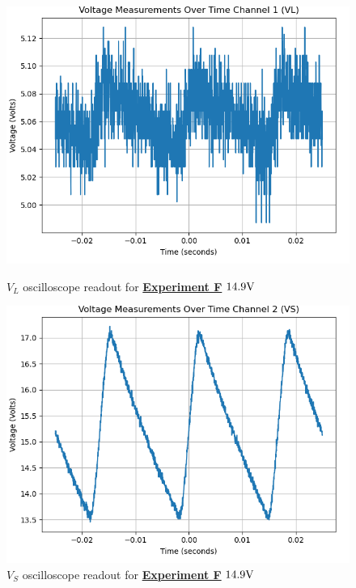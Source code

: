 \documentclass[
	letterpaper
	12pt
]{template}
\newcommand{\bref}[2]{\textbf{\hyperref[#1]{#2}}}
\begin{document}
\begin{figure}[H]\label{data::F3}
	\centering
	\begin{minipage}[c]{0.45\textwidth}
		\centering
		\includegraphics[width=\textwidth]{figures/F/3--ch1.png}
	    \caption{$V_{L}$ oscilloscope readout for \bref{exp::F}{Experiment F} $14.9\unit V$ }
	\end{minipage}
	\hfill
	\begin{minipage}[c]{0.45\textwidth}
		\centering
		\includegraphics[width=\textwidth]{figures/F/3--ch2.png}
	    \caption{$V_{S}$ oscilloscope readout for \bref{exp::F}{Experiment F} $14.9\unit V$ }
	\end{minipage}
\end{figure}
\end{document}
